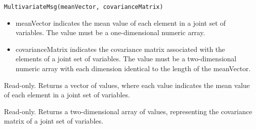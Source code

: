 
\begin{lstlisting}
MultivariateMsg(meanVector, covarianceMatrix)
\end{lstlisting}

\begin{itemize}
\item meanVector indicates the mean value of each element in a joint set of variables.  The value must be a one-dimensional numeric array.
\item covarianceMatrix indicates the covariance matrix associated with the elements of a joint set of variables.  The value must be a two-dimensional numeric array with each dimension identical to the length of the meanVector.
\end{itemize}




Read-only.  Returns a vector of values, where each value indicates the mean value of each element in a joint set of variables.


Read-only.  Returns a two-dimensional array of values, representing the covariance matrix of a joint set of variables.







